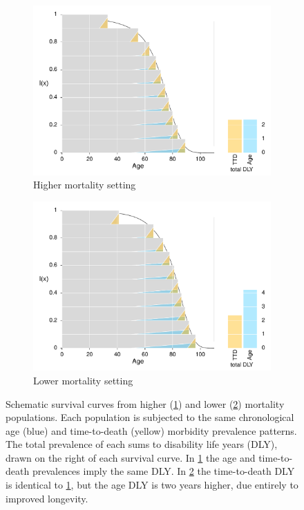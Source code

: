 \documentclass[11pt,oneside,a4paper]{article} %
\begin{document}
\begin{figure}
\centering
\begin{subfigure}{.5\textwidth}
  \centering
  \includegraphics[width=.98\linewidth]{Japan1970}
  \caption{Higher mortality setting}
  \label{fig:toypop1}
\end{subfigure}%
\begin{subfigure}{.5\textwidth}
  \centering
  \includegraphics[width=.98\linewidth]{Japan2010}
  \caption{Lower mortality setting}
  \label{fig:toypop2}
\end{subfigure}
\caption{Schematic survival curves from higher (\ref{fig:toypop1}) and lower
(\ref{fig:toypop2}) mortality populations. Each population is
subjected to the same chronological age (blue) and time-to-death (yellow)
morbidity prevalence patterns. The total prevalence of each sums to disability life years
(DLY), drawn on the right of each survival curve. In \ref{fig:toypop1}
the age and time-to-death prevalences imply the same DLY. In
\ref{fig:toypop2} the time-to-death DLY is identical to \ref{fig:toypop1}, but
the age DLY is two years higher, due entirely to improved longevity.}
\label{fig:test}
\end{figure}
\end{document}
